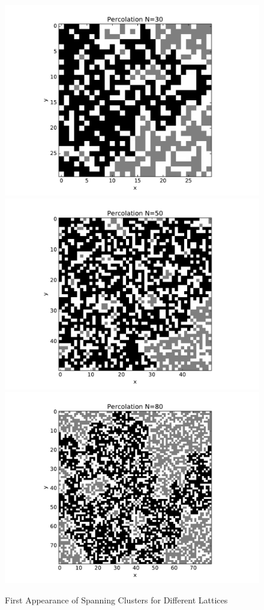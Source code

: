 \documentclass[12pt]{article}
\begin{document}
\begin{figure}[h]
  \includegraphics[width=\linewidth]{percolation_30.pdf}
  \label{delta02}
\endminipage\hfill
{}
  \includegraphics[width=\linewidth]{percolation_50.pdf}
  \label{delta02}
\endminipage\hfill
{}
  \includegraphics[width=\linewidth]{percolation_80.pdf}
  \label{delta02}
\endminipage\hfill
  \caption{First Appearance of Spanning Clusters for Different Lattices}
\end{figure}
\end{document}
